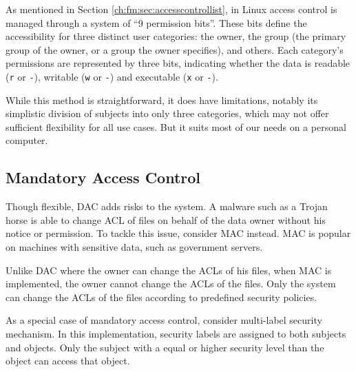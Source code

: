 As mentioned in Section \ref{ch:fm:sec:accesscontrollist}, in Linux access control is managed through a system of ``9 permission bits''. These bits define the accessibility for three distinct user categories: the owner, the group (the primary group of the owner, or a group the owner specifies), and others. Each category's permissions are represented by three bits, indicating whether the data is readable (\verb|r| or \verb|-|), writable (\verb|w| or \verb|-|) and executable (\verb|x| or \verb|-|). 

While this method is straightforward, it does have limitations, notably its simplistic division of subjects into only three categories, which may not offer sufficient flexibility for all use cases. But it suits most of our needs on a personal computer.

\subsection{Mandatory Access Control}

Though flexible, DAC adds risks to the system. A malware such as a Trojan horse is able to change ACL of files on behalf of the data owner without his notice or permission. To tackle this issue, consider MAC instead. MAC is popular on machines with sensitive data, such as government servers.

Unlike DAC where the owner can change the ACLs of his files, when MAC is implemented, the owner cannot change the ACLs of the files. Only the system can change the ACLs of the files according to predefined security policies.

As a special case of mandatory access control, consider multi-label security mechanism. In this implementation, security labels are assigned to both subjects and objects. Only the subject with a equal or higher security level than the object can access that object.










